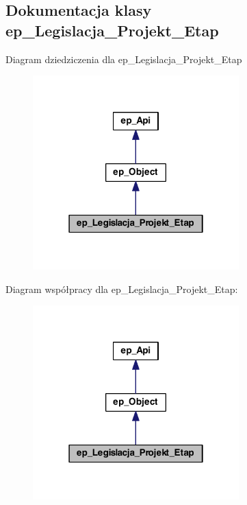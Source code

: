 \hypertarget{classep___legislacja___projekt___etap}{\subsection{Dokumentacja klasy ep\-\_\-\-Legislacja\-\_\-\-Projekt\-\_\-\-Etap}
\label{classep___legislacja___projekt___etap}
}


Diagram dziedziczenia dla ep\-\_\-\-Legislacja\-\_\-\-Projekt\-\_\-\-Etap\nopagebreak
\begin{figure}[H]
\begin{center}
\leavevmode
\includegraphics[width=226pt]{classep___legislacja___projekt___etap__inherit__graph}
\end{center}
\end{figure}


Diagram współpracy dla ep\-\_\-\-Legislacja\-\_\-\-Projekt\-\_\-\-Etap\-:\nopagebreak
\begin{figure}[H]
\begin{center}
\leavevmode
\includegraphics[width=226pt]{classep___legislacja___projekt___etap__coll__graph}
\end{center}
\end{figure}
